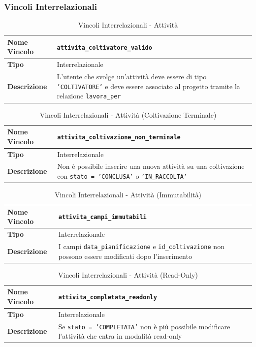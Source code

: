 \documentclass[12pt,a4paper]{article}
\begin{document}
\subsubsection{Vincoli Interrelazionali}

\begin{table}[H]
\centering
\caption{Vincoli Interrelazionali - Attività}
\begin{tabularx}{\textwidth}{|l|X|}
\hline
\textbf{Nome Vincolo} & \texttt{attivita\_coltivatore\_valido} \\
\hline
\textbf{Tipo} & Interrelazionale \\
\hline
\textbf{Descrizione} & L'utente che svolge un'attività deve essere di tipo \texttt{'COLTIVATORE'} e deve essere associato al progetto tramite la relazione \texttt{lavora\_per} \\
\hline
\end{tabularx}
\end{table}

\begin{table}[H]
\centering
\caption{Vincoli Interrelazionali - Attività (Coltivazione Terminale)}
\begin{tabularx}{\textwidth}{|l|X|}
\hline
\textbf{Nome Vincolo} & \texttt{attivita\_coltivazione\_non\_terminale} \\
\hline
\textbf{Tipo} & Interrelazionale \\
\hline
\textbf{Descrizione} & Non è possibile inserire una nuova attività su una coltivazione con \texttt{stato = 'CONCLUSA'} o \texttt{'IN\_RACCOLTA'} \\
\hline
\end{tabularx}
\end{table}

\begin{table}[H]
\centering
\caption{Vincoli Interrelazionali - Attività (Immutabilità)}
\begin{tabularx}{\textwidth}{|l|X|}
\hline
\textbf{Nome Vincolo} & \texttt{attivita\_campi\_immutabili} \\
\hline
\textbf{Tipo} & Interrelazionale \\
\hline
\textbf{Descrizione} & I campi \texttt{data\_pianificazione} e \texttt{id\_coltivazione} non possono essere modificati dopo l'inserimento \\
\hline
\end{tabularx}
\end{table}

\begin{table}[H]
\centering
\caption{Vincoli Interrelazionali - Attività (Read-Only)}
\begin{tabularx}{\textwidth}{|l|X|}
\hline
\textbf{Nome Vincolo} & \texttt{attivita\_completata\_readonly} \\
\hline
\textbf{Tipo} & Interrelazionale \\
\hline
\textbf{Descrizione} & Se \texttt{stato = 'COMPLETATA'} non è più possibile modificare l'attività che entra in modalità read-only \\
\hline
\end{tabularx}
\end{table}
\end{document}

